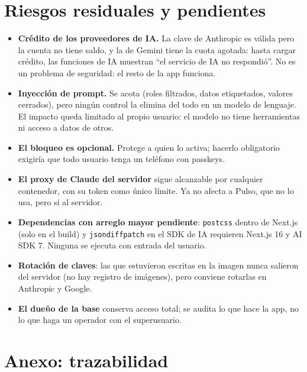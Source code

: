 \documentclass[11pt,letterpaper]{article}
\newcommand{\cod}[1]{\texttt{#1}}
\begin{document}
\section{Riesgos residuales y pendientes}

\begin{itemize}
  \item \textbf{Crédito de los proveedores de IA.} La clave de Anthropic es válida pero la cuenta no tiene saldo, y la de Gemini tiene la cuota agotada: hasta cargar crédito, las funciones de IA muestran ``el servicio de IA no respondió''. No es un problema de seguridad: el resto de la app funciona.
  \item \textbf{Inyección de prompt.} Se acota (roles filtrados, datos etiquetados, valores cerrados), pero ningún control la elimina del todo en un modelo de lenguaje. El impacto queda limitado al propio usuario: el modelo no tiene herramientas ni acceso a datos de otros.
  \item \textbf{El bloqueo es opcional.} Protege a quien lo activa; hacerlo obligatorio exigiría que todo usuario tenga un teléfono con passkeys.
  \item \textbf{El proxy de Claude del servidor} sigue alcanzable por cualquier contenedor, con su token como único límite. Ya no afecta a Pulso, que no lo usa, pero sí al servidor.
  \item \textbf{Dependencias con arreglo mayor pendiente}: \cod{postcss} dentro de Next.js (solo en el build) y \cod{jsondiffpatch} en el SDK de IA requieren Next.js 16 y AI SDK 7. Ninguna se ejecuta con entrada del usuario.
  \item \textbf{Rotación de claves}: las que estuvieron escritas en la imagen nunca salieron del servidor (no hay registro de imágenes), pero conviene rotarlas en Anthropic y Google.
  \item \textbf{El dueño de la base} conserva acceso total; se audita lo que hace la app, no lo que haga un operador con el superusuario.
\end{itemize}

\section*{Anexo: trazabilidad}
\end{document}
